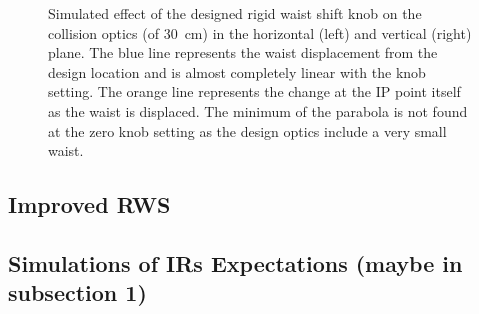 \begin{figure}[htp]
    \centering
    \hspace{0.3cm}
    \caption{Simulated effect of the designed rigid waist shift knob on the collision optics (\betastar of \qty{30}{\centi\metre}) in the horizontal (left) and vertical (right) plane. The blue line represents the waist displacement from the design location and is almost completely linear with the knob setting. The orange line represents the \betafunction change at the IP point itself as the waist is displaced. The minimum of the parabola is not found at the zero knob setting as the design optics include a very small waist.}
    \label{fig:rigid_waist_shift_knob_effect}
\end{figure}

\subsection{Improved RWS}

\subsection{Simulations of IRs Expectations (maybe in subsection 1)}


